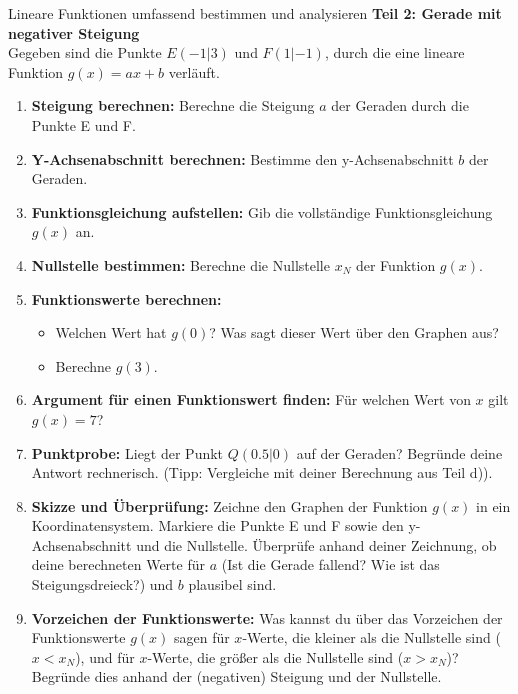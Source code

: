 \begin{aufgabenumgebung}{Lineare Funktionen umfassend bestimmen und analysieren}
\textbf{Teil 2: Gerade mit negativer Steigung} \\
Gegeben sind die Punkte $E(-1|3)$ und $F(1|-1)$, durch die eine lineare Funktion $g(x) = ax+b$ verläuft.

\begin{enumerate}[label=(\alph*)]
    \item \textbf{Steigung berechnen:} Berechne die Steigung $a$ der Geraden durch die Punkte E und F.
    \item \textbf{Y-Achsenabschnitt berechnen:} Bestimme den y-Achsenabschnitt $b$ der Geraden.
    \item \textbf{Funktionsgleichung aufstellen:} Gib die vollständige Funktionsgleichung $g(x)$ an.
    \item \textbf{Nullstelle bestimmen:} Berechne die Nullstelle $x_N$ der Funktion $g(x)$.
    \item \textbf{Funktionswerte berechnen:}
        \begin{itemize}
            \item Welchen Wert hat $g(0)$? Was sagt dieser Wert über den Graphen aus?
            \item Berechne $g(3)$.
        \end{itemize}
    \item \textbf{Argument für einen Funktionswert finden:} Für welchen Wert von $x$ gilt $g(x) = 7$?
    \item \textbf{Punktprobe:} Liegt der Punkt $Q(0.5|0)$ auf der Geraden? Begründe deine Antwort rechnerisch. (Tipp: Vergleiche mit deiner Berechnung aus Teil d)).
    \item \textbf{Skizze und Überprüfung:} Zeichne den Graphen der Funktion $g(x)$ in ein Koordinatensystem. Markiere die Punkte E und F sowie den y-Achsenabschnitt und die Nullstelle. Überprüfe anhand deiner Zeichnung, ob deine berechneten Werte für $a$ (Ist die Gerade fallend? Wie ist das Steigungsdreieck?) und $b$ plausibel sind.
    \item \textbf{Vorzeichen der Funktionswerte:} Was kannst du über das Vorzeichen der Funktionswerte $g(x)$ sagen für $x$-Werte, die kleiner als die Nullstelle sind ($x < x_N$), und für $x$-Werte, die größer als die Nullstelle sind ($x > x_N$)? Begründe dies anhand der (negativen) Steigung und der Nullstelle.
\end{enumerate}
\end{aufgabenumgebung}


